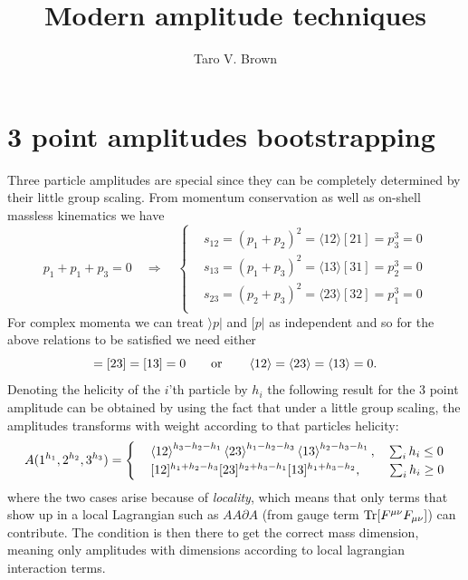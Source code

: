 \documentclass[a4paper,12pt]{article}
\title{Modern amplitude techniques}
\author[a]{Taro V. Brown}
\affiliation[a]{Department of Physics, UC Davis, One Shields Avenue, Davis, CA 95616, USA }
\def\Tr{{\rm Tr}}
\begin{document}
 
\maketitle
\flushbottom
\newpage
\section{3 point amplitudes bootstrapping}
Three particle amplitudes are special since they can be completely determined by their little group scaling. From momentum conservation as well as on-shell massless kinematics we have
\begin{equation}
p_1+p_1+p_3=0\quad \Rightarrow\quad \begin{cases}
&s_{12}=(p_1+p_2)^2=\langle 12\rangle[21]=p_3^3=0\\
&s_{13}=(p_1+p_3)^2=\langle 13\rangle[31]=p_2^3=0\\
&s_{23}=(p_2+p_3)^2=\langle 23\rangle[32]=p_1^3=0\\
\end{cases}
\end{equation}
For complex momenta we can treat $\rangle p|$ and $[p|$ as independent and so for the above relations to be satisfied we need either
\begin{equation}
[12]=[23]=[13]=0\qquad\text{or}\qquad \expval{12}=\expval{23}=\expval{13}=0.
\end{equation}
Denoting the helicity of the $i$'th particle by $h_i$ the following result for the 3 point amplitude can be obtained by using the fact that under a little group scaling, the amplitudes transforms with weight according to that particles helicity:
\begin{equation}
A(1^{h_1},2^{h_2},3^{h_3})
=\begin{cases}
&\expval{12}^{h_3-h_2-h_1}\expval{23}^{h_1-h_2-h_3}\expval{13}^{h_2-h_3-h_1},\quad \sum_i h_i\leq 0\\
&[12]^{h_1+h_2-h_3}[23]^{h_2+h_3-h_1}[13]^{h_1+h_3-h_2},\qquad\: \sum_i h_i\geq 0
\end{cases}
\end{equation}
where the two cases arise because of \textit{locality}, which means that only terms that show up in a local Lagrangian such as $AA\partial A$ (from gauge term $\Tr[F^{\mu\nu}F_{\mu\nu}]$) can contribute. The condition is then there to get the correct mass dimension, meaning only amplitudes with dimensions according to local lagrangian interaction terms.
\end{document}
